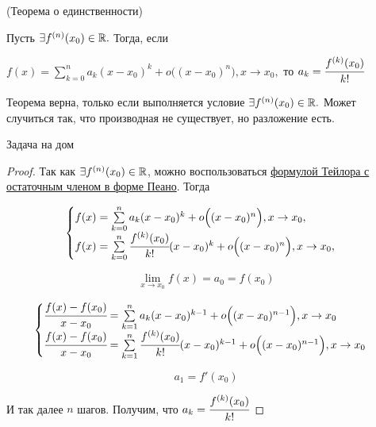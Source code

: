 \begin{theorem}
	\hypertarget{thrm5.16}{(Теорема о единственности)} Пусть $\exists f^{(n)}(x_{0}) \in \mathbb{R}.$ Тогда, если 
	
	$f(x) = \sum\limits_{k =0}^{n} a_{k}(x-x_{0})^{k} + o\Big((x-x_{0})^{n}\Big), x \to x_{0},$ то $a_{k} = \cfrac{f^{(k)}(x_{0})}{k!}$
\end{theorem}
\begin{note}
	Теорема верна, только если выполняется условие $\exists f^{(n)}(x_{0}) \in \mathbb{R}.$ Может случиться так, что производная не существует, но разложение есть.
\begin{example}
	Задача на дом
\end{example} 
\end{note}
\begin{proof}
	Так как $\exists f^{(n)}(x_{0}) \in \mathbb{R}$, можно воспользоваться \hyperlink{thrm5.14}{формулой Тейлора с остаточным членом в форме Пеано}. Тогда 
	
	$$\begin{cases}
		f(x) = \sum\limits_{k = 0}^{n} a_{k} (x-x_{0})^{k} +  o\Big((x-x_{0})^{n}\Big) , x \to x_{0}, \\
		f(x) = \sum\limits_{k = 0}^{n} \cfrac{f^{(k)}(x_{0})}{k!} (x-x_{0})^{k} +  o\Big((x-x_{0})^{n}\Big) , x \to x_{0},
	\end{cases}$$
	
	$$ \lim\limits_{x\to x_{0}} f(x) =  a_{0} = f(x_{0})$$
	
	$$
	\begin{cases}
		\cfrac{f(x)-f(x_{0})}{x-x_{0}} = \sum\limits_{k=1}^{n} a_{k} (x-x_{0})^{k-1} +o\Big((x-x_{0})^{n-1}\Big) , x \to x_{0} \\
		\cfrac{f(x)-f(x_{0})}{x-x_{0}} = \sum\limits_{k=1}^{n} \cfrac{f^{(k)}(x_{0})}{k!} (x-x_{0})^{k-1} +o\Big((x-x_{0})^{n-1}\Big) , x \to x_{0}
	\end{cases}
	 $$
	 
	 $$ a_{1} = f'(x_{0})$$
	 
	 И так далее $n$ шагов. Получим, что $a_{k} = \cfrac{f^{(k)}(x_{0})}{k!}$
\end{proof}

